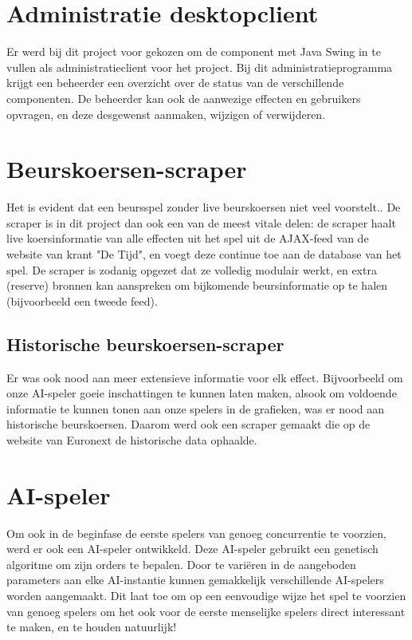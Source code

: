\section{Administratie desktopclient}
Er werd bij dit project voor gekozen om de component met Java Swing in te vullen als administratieclient voor het project. Bij dit administratieprogramma krijgt een beheerder een overzicht over de status van de verschillende componenten. De beheerder kan ook de aanwezige effecten en gebruikers opvragen, en deze desgewenst aanmaken, wijzigen of verwijderen.

\section{Beurskoersen-scraper}
Het is evident dat een beursspel zonder live beurskoersen niet veel voorstelt.. De scraper is in dit project dan ook een van de meest vitale delen: de scraper haalt live koersinformatie van alle effecten uit het spel uit de AJAX-feed van de website van krant "De Tijd", en voegt deze continue toe aan de database van het spel. De scraper is zodanig opgezet dat ze volledig modulair werkt, en extra (reserve) bronnen kan aanspreken om bijkomende beursinformatie op te halen (bijvoorbeeld een tweede feed).
\subsection{Historische beurskoersen-scraper}
Er was ook nood aan meer extensieve informatie voor elk effect. Bijvoorbeeld om onze AI-speler goeie inschattingen te kunnen laten maken, alsook om voldoende informatie te kunnen tonen aan onze spelers in de grafieken, was er nood aan historische beurskoersen. Daarom werd ook een scraper gemaakt die op de website van Euronext de historische data ophaalde.

\section{AI-speler}
Om ook in de beginfase de eerste spelers van genoeg concurrentie te voorzien, werd er ook een AI-speler ontwikkeld. Deze AI-speler gebruikt een genetisch algoritme om zijn orders te bepalen. Door te vari\"eren in de aangeboden parameters aan elke AI-instantie kunnen gemakkelijk verschillende AI-spelers worden aangemaakt. Dit laat toe om op een eenvoudige wijze het spel te voorzien van genoeg spelers om het ook voor de eerste menselijke spelers direct interessant te maken, en te houden natuurlijk!

